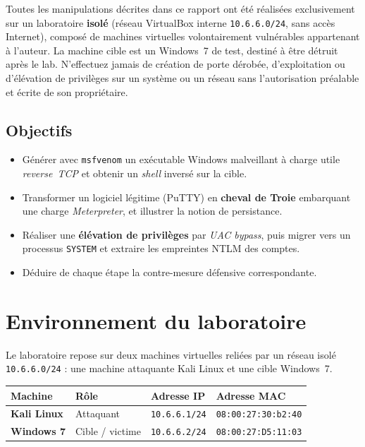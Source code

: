 \documentclass[11pt,a4paper]{article}
\begin{document}
\begin{avertissement}
Toutes les manipulations décrites dans ce rapport ont été réalisées exclusivement sur un
laboratoire \textbf{isolé} (réseau VirtualBox interne \texttt{10.6.6.0/24}, sans accès
Internet), composé de machines virtuelles volontairement vulnérables appartenant à l'auteur.
La machine cible est un Windows~7 de test, destiné à être détruit après le lab. N'effectuez
jamais de création de porte dérobée, d'exploitation ou d'élévation de privilèges sur un
système ou un réseau sans l'autorisation préalable et écrite de son propriétaire.
\end{avertissement}

\subsection{Objectifs}
\begin{itemize}[leftmargin=1.4em]
  \item Générer avec \texttt{msfvenom} un exécutable Windows malveillant à charge utile
        \emph{reverse~TCP} et obtenir un \emph{shell} inversé sur la cible.
  \item Transformer un logiciel légitime (PuTTY) en \textbf{cheval de Troie} embarquant une
        charge \emph{Meterpreter}, et illustrer la notion de persistance.
  \item Réaliser une \textbf{élévation de privilèges} par \emph{UAC bypass}, puis migrer vers
        un processus \texttt{SYSTEM} et extraire les empreintes NTLM des comptes.
  \item Déduire de chaque étape la contre-mesure défensive correspondante.
\end{itemize}

\section{Environnement du laboratoire}
Le laboratoire repose sur deux machines virtuelles reliées par un réseau isolé
\texttt{10.6.6.0/24} : une machine attaquante Kali Linux et une cible Windows~7.

\begin{center}
\renewcommand{\arraystretch}{1.3}
\begin{tabular}{>{\bfseries}l l l l}
\toprule
Machine & Rôle & Adresse IP & Adresse MAC \\
\midrule
Kali Linux & Attaquant & \texttt{10.6.6.1/24} & \texttt{08:00:27:30:b2:40} \\
Windows 7  & Cible / victime & \texttt{10.6.6.2/24} & \texttt{08:00:27:D5:11:03} \\
\bottomrule
\end{tabular}
\end{center}
\end{document}
